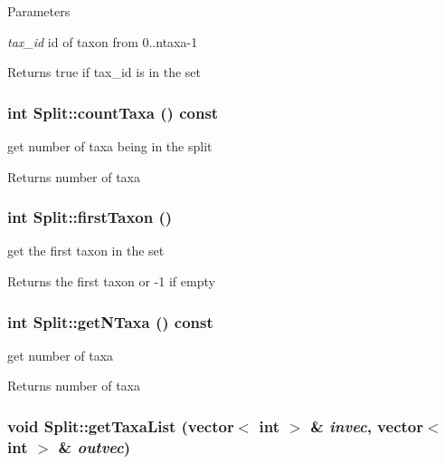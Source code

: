 \begin{DoxyParams}{Parameters}
\item[{\em tax\_\-id}]id of taxon from 0..ntaxa-\/1 \end{DoxyParams}
\begin{DoxyReturn}{Returns}
true if tax\_\-id is in the set 
\end{DoxyReturn}
\hypertarget{classSplit_af7441915bc8fed4333541b193e0394f4}{
\subsubsection[{countTaxa}]{\setlength{\rightskip}{0pt plus 5cm}int Split::countTaxa () const}}
\label{classSplit_af7441915bc8fed4333541b193e0394f4}
get number of taxa being in the split \begin{DoxyReturn}{Returns}
number of taxa 
\end{DoxyReturn}
\hypertarget{classSplit_a2d63d14c00fa83c87afca7a412bced5d}{
\subsubsection[{firstTaxon}]{\setlength{\rightskip}{0pt plus 5cm}int Split::firstTaxon ()}}
\label{classSplit_a2d63d14c00fa83c87afca7a412bced5d}
get the first taxon in the set \begin{DoxyReturn}{Returns}
the first taxon or -\/1 if empty 
\end{DoxyReturn}
\hypertarget{classSplit_a3a2fd4ded9bc1d43c5cdb69b3d057e71}{
\subsubsection[{getNTaxa}]{\setlength{\rightskip}{0pt plus 5cm}int Split::getNTaxa () const}}
\label{classSplit_a3a2fd4ded9bc1d43c5cdb69b3d057e71}
get number of taxa \begin{DoxyReturn}{Returns}
number of taxa 
\end{DoxyReturn}
\hypertarget{classSplit_ab8f398ac2532dbeb5697cb2fc4e5ce6b}{
\subsubsection[{getTaxaList}]{\setlength{\rightskip}{0pt plus 5cm}void Split::getTaxaList (vector$<$ int $>$ \& {\em invec}, \/  vector$<$ int $>$ \& {\em outvec})}}
